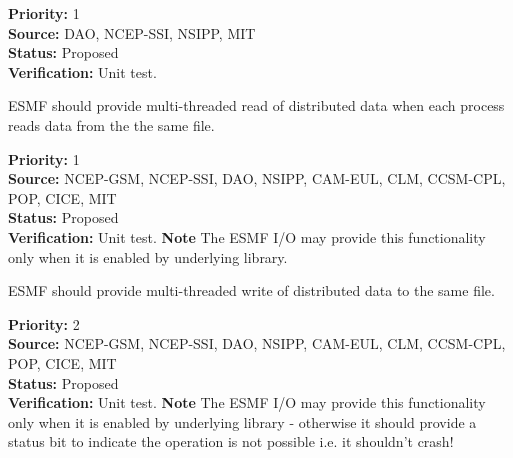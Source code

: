 \begin{reqlist}
{\bf Priority:} 1 \\
{\bf Source:} DAO, NCEP-SSI, NSIPP, MIT \\
{\bf Status:} Proposed \\
{\bf Verification:} Unit test.
\end{reqlist}




ESMF should provide multi-threaded read of distributed data when each
process reads data from the the same file.  

\begin{reqlist}
{\bf Priority:} 1 \\
{\bf Source:} NCEP-GSM, NCEP-SSI, DAO, NSIPP, CAM-EUL, CLM, CCSM-CPL, POP, CICE, MIT \\
{\bf Status:} Proposed \\
{\bf Verification:} Unit test.
{\bf Note} The ESMF I/O may provide this functionality only when it is 
enabled by underlying library. 
\end{reqlist}




ESMF should provide multi-threaded write of distributed data to the same 
file.  

\begin{reqlist}
{\bf Priority:} 2 \\
{\bf Source:} NCEP-GSM, NCEP-SSI, DAO, NSIPP, CAM-EUL, CLM, CCSM-CPL, POP, CICE, MIT \\
{\bf Status:} Proposed \\
{\bf Verification:} Unit test.
{\bf Note} The ESMF I/O may provide this functionality only when it is 
enabled by underlying library - otherwise it should provide a status
bit to indicate the operation is not possible i.e. it shouldn't crash!
\end{reqlist}
